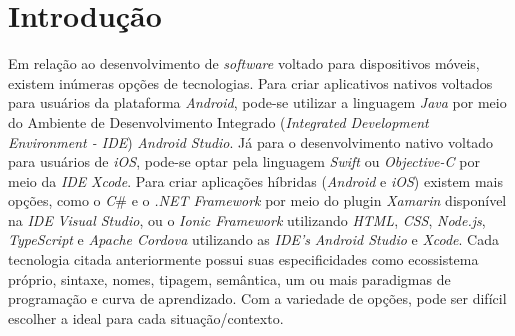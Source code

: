 \chapter{Introdução}
\label{cap:01}
 Em relação ao desenvolvimento de \textit{software} voltado para dispositivos móveis, existem inúmeras opções de tecnologias. Para criar aplicativos nativos voltados para usuários da plataforma \textit{Android}, pode-se utilizar a linguagem \textit{Java} por meio do Ambiente de Desenvolvimento Integrado (\textit{Integrated Development Environment - IDE}) \textit{Android Studio}. Já para o desenvolvimento nativo voltado para usuários de \textit{iOS}, pode-se optar pela linguagem \textit{Swift} ou \textit{Objective-C} por meio da \textit{IDE} \textit{Xcode}. Para criar aplicações híbridas (\textit{Android} e \textit{iOS}) existem mais opções, como o \newcommand{\Csh}{\textit{C}{\lserif\#}}\Csh{} e o \textit{.NET Framework} por meio do plugin \textit{Xamarin} disponível na \textit{IDE} \textit{Visual Studio}, ou o \textit{Ionic Framework} utilizando \textit{HTML}, \textit{CSS}, \textit{Node.js}, \textit{TypeScript} e \textit{Apache Cordova} utilizando as \textit{IDE's} \textit{Android Studio} e \textit{Xcode}. Cada tecnologia citada anteriormente possui suas especificidades como ecossistema próprio, sintaxe, nomes, tipagem, semântica, um ou mais paradigmas de programação e curva de aprendizado. Com a variedade de opções, pode ser difícil escolher a ideal para cada situação/contexto.

